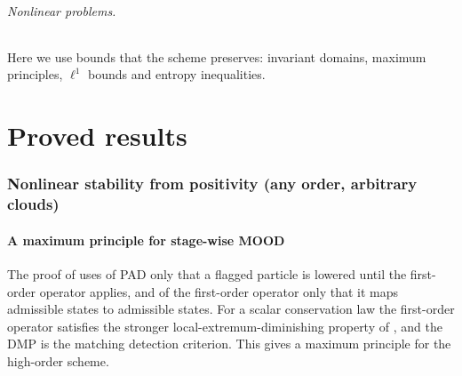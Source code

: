 \documentclass[11pt,a4paper]{article}
\theoremstyle{plain}
\theoremstyle{definition}
\theoremstyle{remark}
\numberwithin{equation}{section}
\newcommand{\A}[1]{\cite[#1]{Addendum}}
\begin{document}
\paragraph{Nonlinear problems.} Here we use bounds that the scheme preserves: invariant domains, maximum principles, $\ell^1$ bounds and entropy inequalities.

\part{Proved results}

\section{Nonlinear stability from positivity (any order, arbitrary clouds)}\label{sec:nonlinear}

\subsection{A maximum principle for stage-wise MOOD}

The proof of \A{Thm.~6.3} uses of PAD only that a flagged particle is lowered until the first-order operator applies, and of the first-order operator only that it maps admissible states to admissible states. For a scalar conservation law the first-order operator satisfies the stronger local-extremum-diminishing property of \A{Cor.~5.3}, and the DMP \A{(6.4)} is the matching detection criterion. This gives a maximum principle for the high-order scheme.
\end{document}

